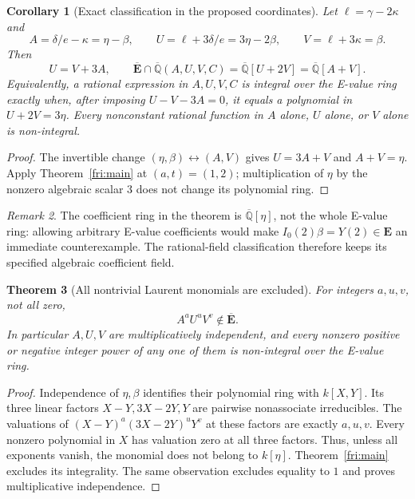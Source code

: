 \documentclass[11pt]{article}
\newtheorem{theorem}{Theorem}[section]
\newtheorem{corollary}[theorem]{Corollary}
\theoremstyle{definition}
\theoremstyle{remark}
\newtheorem{remark}[theorem]{Remark}
\newcommand{\Qa}{\overline{\mathbb Q}}
\newcommand{\E}{\mathbf E}
\newcommand{\Ebar}{\overline{\mathbf E}}
\begin{document}
\begin{corollary}[Exact classification in the proposed coordinates]
\label{etaclass:coordinates}
Let $\ell=\gamma-2\kappa$ and
\[
 A=\delta/e-\kappa=\eta-\beta,\qquad
 U=\ell+3\delta/e=3\eta-2\beta,\qquad
 V=\ell+3\kappa=\beta.
\]
Then
\[
 U=V+3A,\qquad
 \Ebar\cap\Qa(A,U,V,C)=\Qa[U+2V]
 =\Qa[A+V].
\]
Equivalently, a rational expression in $A,U,V,C$ is integral over the
E-value ring exactly when, after imposing $U-V-3A=0$, it equals
a polynomial in $U+2V=3\eta$. Every nonconstant rational function
in $A$ alone, $U$ alone, or $V$ alone is non-integral.
\end{corollary}
\begin{proof}
The invertible change $(\eta,\beta)\leftrightarrow(A,V)$ gives
$U=3A+V$ and $A+V=\eta$.  Apply
Theorem~\ref{fri:main} at $(a,t)=(1,2)$; multiplication of $\eta$
by the nonzero algebraic scalar $3$ does not change its polynomial ring.
\end{proof}


\begin{remark}
The coefficient ring in the theorem is $\Qa[\eta]$, not the
whole E-value ring: allowing arbitrary E-value coefficients
would make $I_0(2)\beta=Y(2)\in\E$ an immediate counterexample.
The rational-field classification therefore keeps its specified
algebraic coefficient field.
\end{remark}

\begin{theorem}[All nontrivial Laurent monomials are excluded]
\label{etaclass:laurent}
For integers $a,u,v$, not all zero,
\[
 A^aU^uV^v\notin\Ebar.
\]
In particular $A,U,V$ are multiplicatively independent, and every
nonzero positive or negative integer power of any one of them is
non-integral over the E-value ring.
\end{theorem}
\begin{proof}
Independence of $\eta,\beta$ identifies their polynomial ring with
$k[X,Y]$. Its three linear factors $X-Y,3X-2Y,Y$ are pairwise
nonassociate irreducibles. The valuations of
$(X-Y)^a(3X-2Y)^uY^v$ at these factors are exactly $a,u,v$.
Every nonzero polynomial in $X$ has valuation zero at all three
factors. Thus, unless all exponents vanish, the monomial does not
belong to $k[\eta]$. Theorem~\ref{fri:main} excludes its integrality.
The same observation excludes equality to $1$ and proves
multiplicative independence.
\end{proof}
\end{document}
